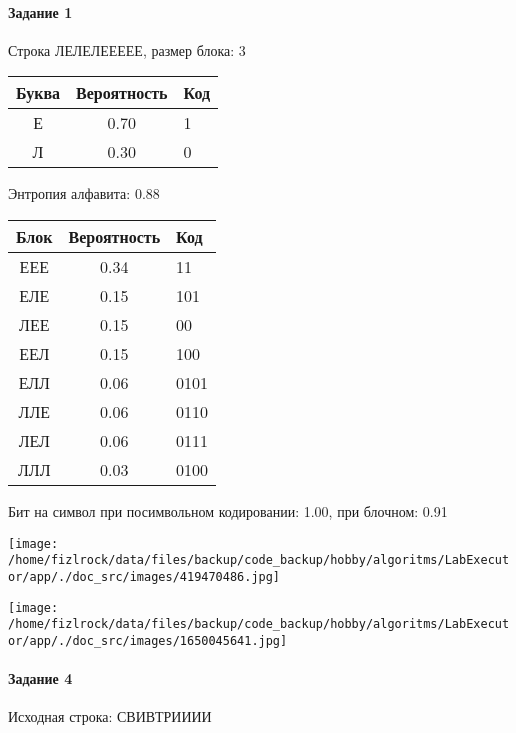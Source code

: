 \documentclass[a4paper, 12pt]{article}
\begin{document}
\paragraph{Задание 1}

Строка ЛЕЛЕЛЕЕЕЕЕ, размер блока: 3
\begin{center}
 \begin{tabular}{ |c|c|l| } 
  \hline
     Буква & Вероятность & Код\\ \hline
Е & 0.70 & 1\\\hline
Л & 0.30 & 0
\\ \hline \end{tabular}
\end{center}
Энтропия алфавита: 0.88
\begin{center}
 \begin{tabular}{ |c|c|l| } 
  \hline
     Блок & Вероятность & Код\\ \hline
ЕЕЕ & 0.34 & 11\\\hline
ЕЛЕ & 0.15 & 101\\\hline
ЛЕЕ & 0.15 & 00\\\hline
ЕЕЛ & 0.15 & 100\\\hline
ЕЛЛ & 0.06 & 0101\\\hline
ЛЛЕ & 0.06 & 0110\\\hline
ЛЕЛ & 0.06 & 0111\\\hline
ЛЛЛ & 0.03 & 0100
\\ \hline \end{tabular}
\end{center}
Бит на символ при посимвольном кодировании: 1.00, при блочном: 0.91

\texttt{[image: /home/fizlrock/data/files/backup/code\_backup/hobby/algoritms/LabExecutor/app/./doc\_src/images/419470486.jpg]}

\texttt{[image: /home/fizlrock/data/files/backup/code\_backup/hobby/algoritms/LabExecutor/app/./doc\_src/images/1650045641.jpg]}
\paragraph{Задание 4}


Исходная строка: СВИВТРИИИИ
\end{document}

